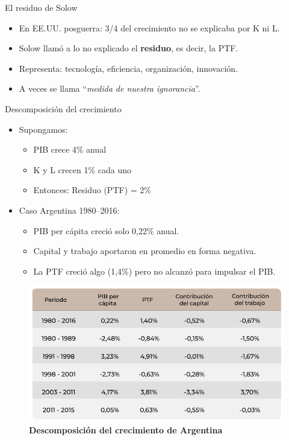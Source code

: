 \documentclass{beamer}
\begin{document}
\begin{frame}{El residuo de Solow}
    \begin{itemize}
        \item En EE.UU. posguerra: 3/4 del crecimiento no se explicaba por K ni L.
        \item Solow llamó a lo no explicado el \textbf{residuo}, es decir, la PTF.
        \item Representa: tecnología, eficiencia, organización, innovación.
        \item A veces se llama “\textit{medida de nuestra ignorancia}”.
    \end{itemize}
\end{frame}

\begin{frame}{Descomposición del crecimiento}
    \scriptsize
    \begin{itemize}
        \scriptsize
        \item Supongamos:
        \begin{itemize}
            \scriptsize
            \item PIB crece 4\% anual
            \item K y L crecen 1\% cada uno
            \item Entonces: Residuo (PTF) = 2\%
        \end{itemize}
        \item Caso Argentina 1980--2016:
        \begin{itemize}
            \scriptsize
            \item PIB per cápita creció solo 0{,}22\% anual.
            \item Capital y trabajo aportaron en promedio en forma negativa.
            \item La PTF creció algo (1{,}4\%) pero no alcanzó para impulsar el PIB.
        \end{itemize}
    \end{itemize}
    \begin{figure} [H]   
        \includegraphics[scale=0.45]{../Figures/C30.8.png}
        \caption{\tiny \textbf{Descomposición del crecimiento de Argentina}}
    \end{figure}
\end{frame}
\end{document}
